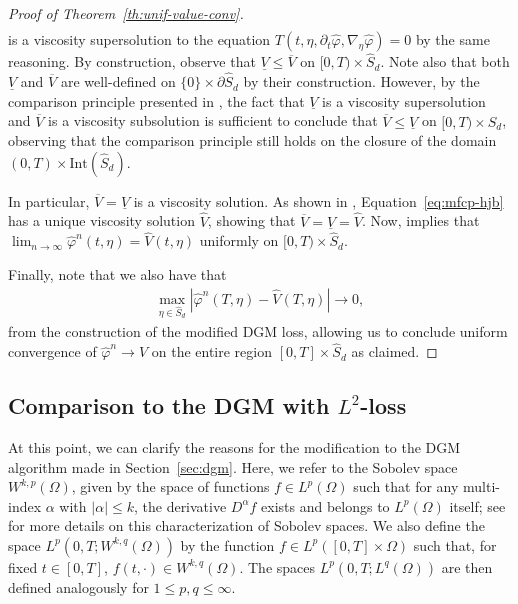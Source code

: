 \documentclass[11pt,reqno]{amsart}
\numberwithin{equation}{section}
\theoremstyle{plain}
\newcommand{\intr}{\text{Int}}
\begin{document}
\begin{proof}[Proof of Theorem~\ref{th:unif-value-conv}]
\begin{align*}
\end{align*}
is a viscosity supersolution to the equation $T(t,\eta, \partial_t \widehat{\varphi}, \nabla_\eta \widehat{\varphi}) = 0$ by the same reasoning. By construction, observe that $\underline{V} \leq \overline{V}$ on $[0,T) \times \widehat{S}_d$. Note also that both $\underline{V}$ and $\overline{V}$ are well-defined on $\{0\} \times \partial \widehat{S}_d$ by their construction. However, by the comparison principle presented in \cite[Theorem 3.3]{visc-users}, the fact that $\underline{V}$ is a viscosity supersolution and $\overline{V}$ is a viscosity subsolution is sufficient to conclude that $\overline{V} \leq \underline{V}$ on $[0,T) \times \widehat{S}_d$, observing that the comparison principle still holds on the closure of the domain $(0, T) \times \intr(\widehat{S}_d)$.

In particular, $\overline{V} = \underline{V}$ is a viscosity solution. As shown in \cite[Theorem 9]{mfcp}, Equation~\eqref{eq:mfcp-hjb} has a unique viscosity solution $\widehat{V}$, showing that $\overline{V} = \underline{V} = \widehat{V}$. Now, \cite[Remark 6.4]{visc-users} implies that $\lim_{n \to \infty} \widehat{\varphi}^n(t, \eta) = \widehat{V}(t, \eta)$ uniformly on $[0, T) \times \widehat{S}_d$.



Finally, note that we also have that
\begin{align*}
   \max_{\eta \in \widehat{S}_d}\left|\widehat{\varphi}^n(T, \eta) - \widehat{V}(T, \eta)\right| \to 0,
\end{align*}
from the construction of the modified DGM loss, allowing us to conclude uniform convergence of $\widehat{\varphi}^n \to \widehat{V}$ on the entire region $[0, T] \times \widehat{S}_d$ as claimed.
\end{proof}

\subsection{Comparison to the DGM with $L^2$-loss}
\label{subsec:comp-original-dgm}
\normalfont
At this point, we can clarify the reasons for the modification to the DGM algorithm made in Section~\ref{sec:dgm}. Here, we refer to the Sobolev space $W^{k,p}(\Omega)$, given by the space of functions $f \in L^p(\Omega)$ such that for any multi-index $\alpha$ with $|\alpha| \leq k$, the derivative $D^\alpha f$ exists and belongs to $L^p(\Omega)$ itself; see \cite[Chapter 5]{evans-pde} for more details on this characterization of Sobolev spaces. We also define the space $L^p(0, T; W^{k, q}(\Omega))$ by the function $f \in L^p([0, T] \times \Omega)$ such that, for fixed $t \in [0, T]$, $f(t, \cdot) \in W^{k, q}(\Omega)$. The spaces $L^p(0, T; L^q(\Omega))$ are then defined analogously for $1 \leq p, q \leq \infty$. 
\end{document}

